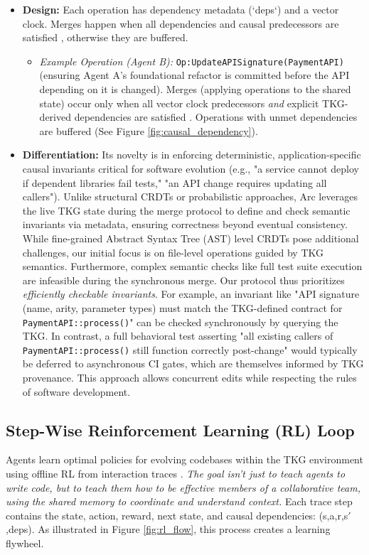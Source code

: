 \documentclass{article}
\begin{document}
\begin{itemize}
  \item \textbf{Design:} Each operation has dependency metadata (`deps`) and a vector clock. Merges happen when all dependencies and causal predecessors are satisfied \cite{ref5,ref14,ref15,ref24}, otherwise they are buffered.
      \begin{itemize}
          \item \textit{Example Operation (Agent B):} \verb|Op:UpdateAPISignature(PaymentAPI)| (ensuring Agent A's foundational refactor is committed before the API depending on it is changed). Merges (applying operations to the shared state) occur only when all vector clock predecessors \textit{and} explicit TKG-derived dependencies are satisfied \cite{ref9, ref20, ref21, ref22}. Operations with unmet dependencies are buffered (See Figure \ref{fig:causal_dependency}).
      \end{itemize}

  \item \textbf{Differentiation:} Its novelty is in enforcing deterministic, application-specific causal invariants critical for software evolution (e.g., "a service cannot deploy if dependent libraries fail tests," "an API change requires updating all callers"). Unlike structural CRDTs or probabilistic approaches, Arc leverages the live TKG state during the merge protocol to define and check semantic invariants via metadata, ensuring correctness beyond eventual consistency.
While fine-grained Abstract Syntax Tree (AST) level CRDTs pose additional challenges, our initial focus is on file-level operations guided by TKG semantics. Furthermore, complex semantic checks like full test suite execution are infeasible during the synchronous merge. Our protocol thus prioritizes \textit{efficiently checkable invariants}. For example, an invariant like "API signature (name, arity, parameter types) must match the TKG-defined contract for \verb|PaymentAPI::process()|" can be checked synchronously by querying the TKG. In contrast, a full behavioral test asserting "all existing callers of \verb|PaymentAPI::process()| still function correctly post-change" would typically be deferred to asynchronous CI gates, which are themselves informed by TKG provenance. This approach allows concurrent edits while respecting the rules of software development.
\end{itemize}

\subsection{Step-Wise Reinforcement Learning (RL) Loop}
Agents learn optimal policies for evolving codebases within the TKG environment using offline RL from interaction traces \cite{ref12, ref19}. \textit{The goal isn't just to teach agents to write code, but to teach them how to be effective members of a collaborative team, using the shared memory to coordinate and understand context.} Each trace step contains the state, action, reward, next state, and causal dependencies: (s,a,r,s$'$,deps). As illustrated in Figure \ref{fig:rl_flow}, this process creates a learning flywheel.
\end{document}
